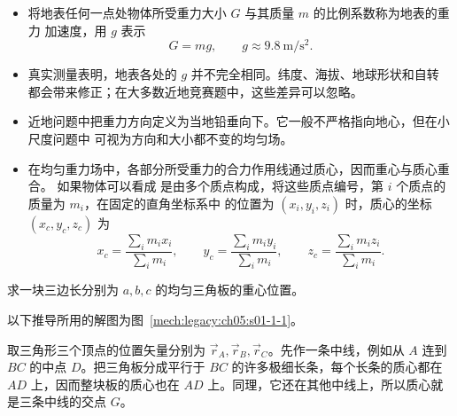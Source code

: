 {\begin{itemize}
  \item 将地表任何一点处物体所受重力大小 $G$ 与其质量 $m$ 的比例系数称为地表的重力
  加速度，用 $g$ 表示
  \begin{equation}
    G=mg,\qquad g\approx\SI{9.8}{\metre\per\second\squared}.
  \end{equation}

  \item 真实测量表明，地表各处的 $g$ 并不完全相同。纬度、海拔、地球形状和自转
  都会带来修正；在大多数近地竞赛题中，这些差异可以忽略。

  \item 近地问题中把重力方向定义为当地铅垂向下。它一般不严格指向地心，但在小尺度问题中
  可视为方向和大小都不变的均匀场。

  \item 在均匀重力场中，各部分所受重力的合力作用线通过质心，因而重心与质心重合。
  如果物体可以看成
  是由多个质点构成，将这些质点编号，第 $i$ 个质点的质量为 $m_i$，在固定的直角坐标系中
  的位置为 $(x_i,y_i,z_i)$ 时，质心的坐标 $(x_c,y_c,z_c)$ 为
  \begin{equation}
    x_c=\frac{\sum_i m_ix_i}{\sum_i m_i},\qquad
    y_c=\frac{\sum_i m_iy_i}{\sum_i m_i},\qquad
    z_c=\frac{\sum_i m_iz_i}{\sum_i m_i}.
  \end{equation}
\end{itemize}

\begin{origexamplebox}{}\label{ch05:ex:s01-1-1}
求一块三边长分别为 $a,b,c$ 的均匀三角板的重心位置。

\begin{center}
\end{center}
\end{origexamplebox}

\begin{xesolution}
以下推导所用的解图为图~\ref{mech:legacy:ch05:s01-1-1}。

取三角形三个顶点的位置矢量分别为 $\vec r_A,\vec r_B,\vec r_C$。先作一条中线，例如从
$A$ 连到 $BC$ 的中点 $D$。把三角板分成平行于 $BC$ 的许多极细长条，每个长条的质心都在
$AD$ 上，因而整块板的质心也在 $AD$ 上。同理，它还在其他中线上，所以质心就是三条中线的交点 $G$。


\end{xesolution}}
